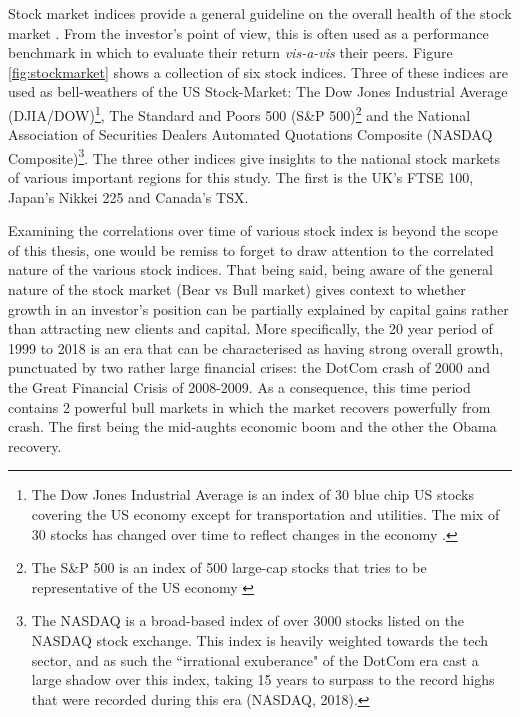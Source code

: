 Stock market indices provide a general guideline on the overall health of the stock market \citep{Lo21}.  From the investor's point of view, this is often used as a performance benchmark in which to evaluate their return \textit{vis-a-vis} their peers. Figure \ref{fig:stockmarket} shows a collection of six stock indices.  Three of these indices are used as bell-weathers of the US Stock-Market: The Dow Jones Industrial Average (DJIA/DOW)\footnote{The Dow Jones Industrial Average is an index of 30 blue chip US stocks covering the US economy except for transportation and utilities.  The mix of 30 stocks has changed over time to reflect changes in the economy \citep{DOW2020}.}, The Standard and Poors 500 (S\&P 500)\footnote{The S\&P 500 is an index of 500 large-cap stocks that tries to be representative of the US economy \citep{SNP2020}} and the National Association of Securities Dealers Automated Quotations Composite (NASDAQ Composite)\footnote{The NASDAQ is a broad-based index of over 3000 stocks listed on the NASDAQ stock exchange.  This index is heavily weighted towards the tech sector, and as such the ``irrational exuberance" of the DotCom era cast a large shadow over this index, taking 15 years to surpass to the record highs that were recorded during this era (NASDAQ, 2018)\nocite{NASDAQ2018}.}.   The three other indices give insights to the national stock markets of various important regions for this study.  The first is the UK's FTSE 100, Japan's Nikkei 225 and Canada's TSX.  

Examining the correlations over time of various stock index is beyond the scope of this thesis, one would be remiss to forget to draw attention to the correlated nature of the various stock indices.  That being said, being aware of the general nature of the stock market (Bear vs Bull market) gives context to whether growth in an investor's position can be partially explained by capital gains rather than attracting new clients and capital.  More specifically, the 20 year period of 1999 to 2018 is an era that can be characterised as having strong overall growth, punctuated by two rather large financial crises: the DotCom crash of 2000 and the Great Financial Crisis of 2008-2009.  As a consequence, this time period contains 2 powerful bull markets in which the market recovers powerfully from crash.  The first being the mid-aughts economic boom and the other the Obama recovery.




